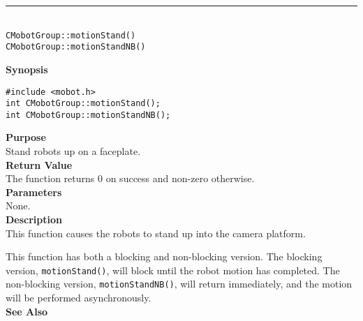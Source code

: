 \noindent
\vspace{5pt}
\rule{4.5in}{0.015in}\\
\noindent
{\LARGE \texttt{CMobotGroup::motionStand()}}\\
{\LARGE \texttt{CMobotGroup::motionStandNB()}}\\
{}

\noindent
{\bf Synopsis}\\
\begin{verbatim}
#include <mobot.h>
int CMobotGroup::motionStand();
int CMobotGroup::motionStandNB();
\end{verbatim}

\noindent
{\bf Purpose}\\
Stand robots up on a faceplate.\\

\noindent
{\bf Return Value}\\
The function returns 0 on success and non-zero otherwise.\\

\noindent
{\bf Parameters}\\
None.\\

\noindent
{\bf Description}\\
This function causes the robots to stand up into the camera platform.

This function has both a blocking and non-blocking version.
The blocking version, \texttt{motionStand()}, will block until the
robot motion has completed. The non-blocking version, \texttt{motionStandNB()},
will return immediately, and the motion will be performed asynchronously.\\

\noindent
{\bf See Also}\\

